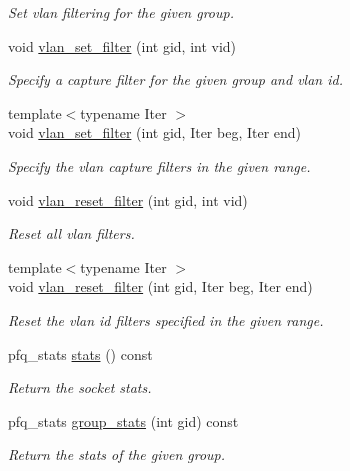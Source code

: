 \begin{DoxyCompactItemize}
\begin{DoxyCompactList}\small\item\em Set vlan filtering for the given group. \end{DoxyCompactList}\item 
void \hyperlink{classnet_1_1pfq_ae659846711122122b7a086f70e4b2375}{vlan\+\_\+set\+\_\+filter} (int gid, int vid)
\begin{DoxyCompactList}\small\item\em Specify a capture filter for the given group and vlan id. \end{DoxyCompactList}\item 
{\footnotesize template$<$typename Iter $>$ }\\void \hyperlink{classnet_1_1pfq_a92c3d3dd0a6a194dd0c6f3f8af3b8ffa}{vlan\+\_\+set\+\_\+filter} (int gid, Iter beg, Iter end)
\begin{DoxyCompactList}\small\item\em Specify the vlan capture filters in the given range. \end{DoxyCompactList}\item 
void \hyperlink{classnet_1_1pfq_a97110c0362a20cabdb49e4d2ac5d935d}{vlan\+\_\+reset\+\_\+filter} (int gid, int vid)
\begin{DoxyCompactList}\small\item\em Reset all vlan filters. \end{DoxyCompactList}\item 
{\footnotesize template$<$typename Iter $>$ }\\void \hyperlink{classnet_1_1pfq_ab889e0293649d06ecdc626038fb7af44}{vlan\+\_\+reset\+\_\+filter} (int gid, Iter beg, Iter end)
\begin{DoxyCompactList}\small\item\em Reset the vlan id filters specified in the given range. \end{DoxyCompactList}\item 
pfq\+\_\+stats \hyperlink{classnet_1_1pfq_a4eaca8322c9f3926df19dda2a097fa3c}{stats} () const 
\begin{DoxyCompactList}\small\item\em Return the socket stats. \end{DoxyCompactList}\item 
pfq\+\_\+stats \hyperlink{classnet_1_1pfq_a37f5f1afcffcb6000cce15282fcf8d4b}{group\+\_\+stats} (int gid) const 
\begin{DoxyCompactList}\small\item\em Return the stats of the given group. \end{DoxyCompactList}\item 

\end{DoxyCompactItemize}
